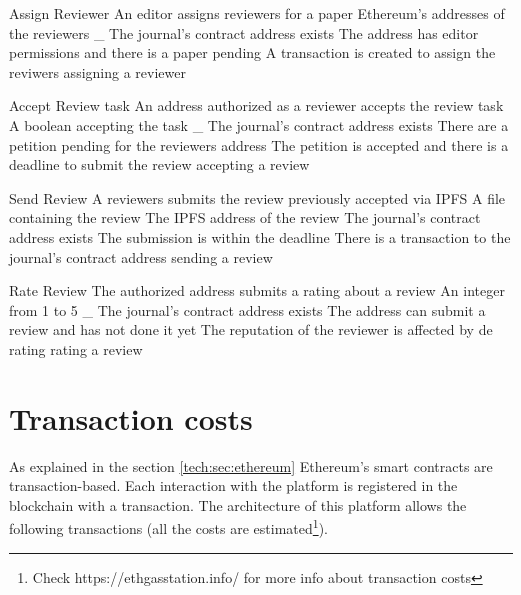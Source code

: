 {Assign Reviewer}%
{An editor assigns reviewers for a paper}%
{Ethereum's addresses of the reviewers}%
{_}%
{The journal's contract address exists} {The address has editor permissions and
  there is a paper pending}%
{A transaction is created to assign the reviwers}%
{assigning a reviewer}%

{Accept Review task}%
{An address authorized as a reviewer accepts the review
  task}%
{A boolean accepting the task}%
{_}%
{The journal's contract address exists}%
{There are a petition pending for the reviewers address}%
{The petition is accepted and there is a deadline to submit the
  review}%
{accepting a review}%

{Send Review}%
{A reviewers submits the review previously accepted via
  IPFS}%
{A file containing the review}%
{The IPFS address of the review}%
{The journal's contract address exists}%
{The submission is within the deadline}%
{There is a transaction to the journal's contract address}%
{sending a review}%

{Rate Review}%
{The authorized address submits a rating about a review}%
{An integer from 1 to 5}%
{_}%
{The journal's contract address exists}%
{The address can submit a review and has not done it yet}%
{The reputation of the reviewer is affected by de rating}%
{rating a review}%
\section{Transaction costs}
\label{arch:trans}

As explained in the section \ref{tech:sec:ethereum} Ethereum's smart contracts
are transaction-based. Each interaction with the platform is registered in the
blockchain with a transaction. The architecture of this platform allows the
following transactions (all the costs are estimated\footnote{Check
  https://ethgasstation.info/ for more info about transaction costs}).

